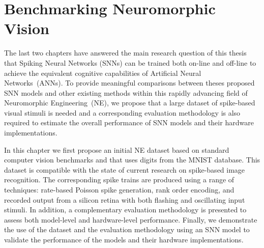 \chapter{Benchmarking Neuromorphic Vision}
\label{cha:bench}


The last two chapters have answered the main research question of this thesis that Spiking Neural Networks (SNNs) can be trained both on-line and off-line to achieve the equivalent cognitive capabilities of Artificial Neural Networks~(ANNs).
To provide meaningful comparisons between theses proposed SNN models and other existing methods within this rapidly advancing field of Neuromorphic Engineering~(NE), we propose that a large dataset of spike-based visual stimuli is needed and a corresponding evaluation methodology is also required to estimate the overall performance of SNN models and their hardware implementations.

%

In this chapter we first propose an initial NE dataset based on standard computer vision benchmarks and that uses digits from the MNIST database.
This dataset is compatible with the state of current research on spike-based image recognition.
The corresponding spike trains are produced using a range of techniques: rate-based Poisson spike generation, rank order encoding, and recorded output from a silicon retina with both flashing and oscillating input stimuli.
In addition, a complementary evaluation methodology is presented to assess both model-level and hardware-level performance.
Finally, we demonstrate the use of the dataset and the evaluation methodology using an SNN model to validate the performance of the models and their hardware implementations.


